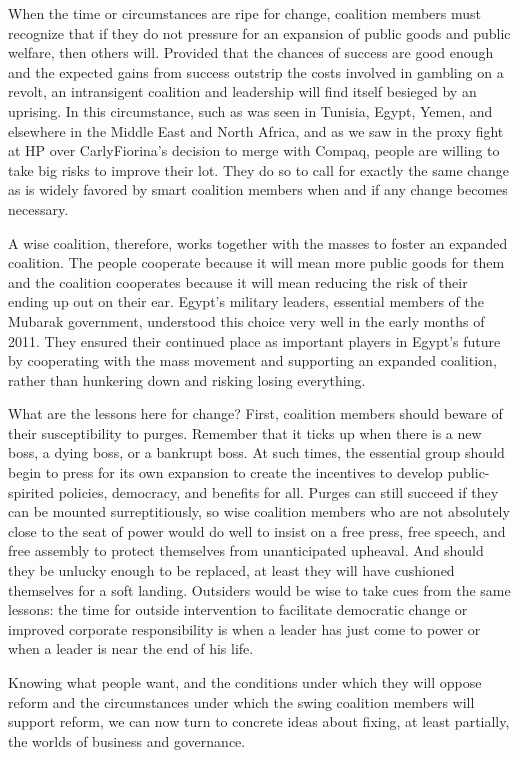 \documentclass[10pt]{article}
\begin{document}
{\large When the time or circumstances are ripe for change, coalition members
must recognize that if they do not pressure for an expansion of public goods and
public welfare, then others will. Provided that the chances of success are good
enough and the expected gains from success outstrip the costs involved in
gambling on a revolt, an intransigent coalition and leadership will find itself
besieged by an uprising. In this circumstance, such as was seen in Tunisia,
Egypt, Yemen, and elsewhere in the Middle East and North Africa, and as we saw in
the proxy fight at HP over CarlyFiorina's decision to merge with Compaq, people
are willing to take big risks to improve their lot. They do so to call for
exactly the same change as is widely favored by smart coalition members when and
if any change becomes necessary.}

{\large A wise coalition, therefore, works together with the masses to foster an
expanded coalition. The people cooperate because it will mean more public goods
for them and the coalition cooperates because it will mean reducing the risk of
their ending up out on their ear. Egypt's military leaders, essential members of
the Mubarak government, understood this choice very well in the early months of
2011. They ensured their continued place as important players in Egypt's future
by cooperating with the mass movement and supporting an expanded coalition,
rather than hunkering down and risking losing everything.}

{\large What are the lessons here for change? First, coalition members should
beware of their susceptibility to purges. Remember that it ticks up when there is
a new boss, a dying boss, or a bankrupt boss. At such times, the essential group
should begin to press for its own expansion to create the incentives to develop
public-spirited policies, democracy, and benefits for all. Purges can still
succeed if they can be mounted surreptitiously, so wise coalition members who are
not absolutely close to the seat of power would do well to insist on a free
press, free speech, and free assembly to protect themselves from unanticipated
upheaval. And should they be unlucky enough to be replaced, at least they will
have cushioned themselves for a soft landing. Outsiders would be wise to take
cues from the same lessons: the time for outside intervention to facilitate
democratic change or improved corporate responsibility is when a leader has just
come to power or when a leader is near the end of his life.}

{\large Knowing what people want, and the conditions under which they will
oppose reform and the circumstances under which the swing coalition members will
support reform, we can now turn to concrete ideas about fixing, at least
partially, the worlds of business and governance.}
\end{document}
